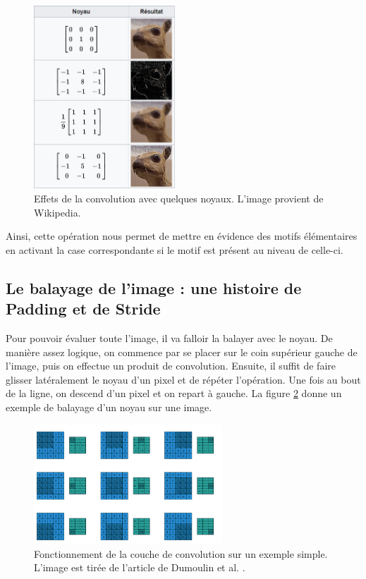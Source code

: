 \begin{figure}[!h]
\centering
\includegraphics[width=150pt]{images/cnn/chien_prairie.png} 
\caption{Effets de la convolution avec quelques noyaux. L'image provient de Wikipedia.}
\label{chien_prairie}
\end{figure}

Ainsi, cette opération nous permet de mettre en évidence des motifs élémentaires en activant la case correspondante si le motif est présent au niveau de celle-ci.

\subsection{Le balayage de l'image : une histoire de Padding et de Stride}

Pour pouvoir évaluer toute l'image, il va falloir la balayer avec le noyau. De manière assez logique, on commence par se placer sur le coin supérieur gauche de l'image, puis on effectue un produit de convolution. Ensuite, il suffit de faire glisser latéralement le noyau d'un pixel et de répéter l'opération. Une fois au bout de la ligne, on descend d'un pixel et on repart à gauche. La figure \ref{convolution} donne un exemple de balayage d'un noyau sur une image.

\begin{figure}[!h]
\centering
\includegraphics[width=200pt]{images/cnn/convolution.png}
\caption{Fonctionnement de la couche de convolution sur un exemple simple. L'image est tirée de l'article de Dumoulin et al. \cite{dumoulin_guide_2018}.}
\label{convolution}
\end{figure}

